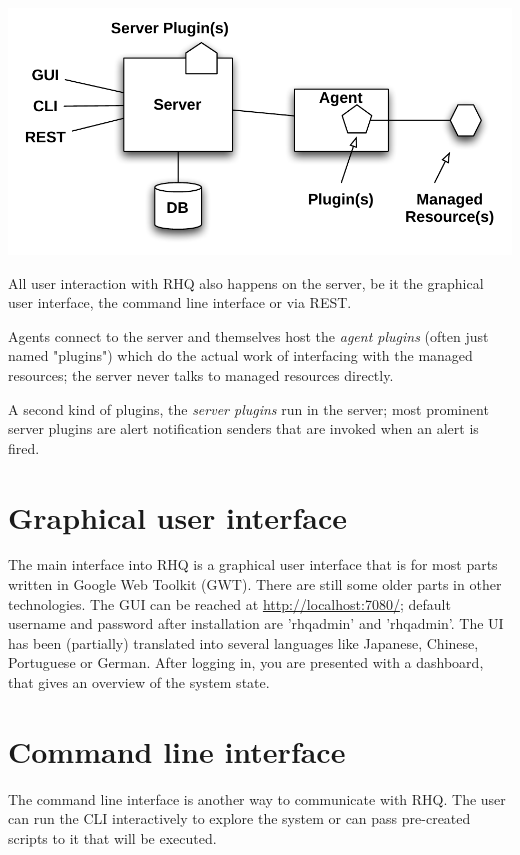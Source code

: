 \documentclass[twocolumn,10pt,a4paper]{article}
\begin{document}
\noindent\includegraphics[width=\columnwidth]{graph/arch.pdf}

All user interaction with RHQ also happens on the server, be it the graphical
user interface, the command line interface or via REST. 

Agents connect to the server and themselves host the \emph{agent plugins} (often
just named "plugins") which do the actual work of interfacing with the managed
resources; the server never talks to managed resources directly.

A second kind of plugins, the \emph{server plugins} run in the server; most
prominent server plugins are alert notification senders that are invoked when an
alert is fired.

\section{Graphical user interface}

The main interface into RHQ is a graphical user interface that is for most parts
written in Google Web Toolkit (GWT). There are still some older parts in other
technologies. The GUI can be reached at \url{http://localhost:7080/}; default
username and password after installation are 'rhqadmin' and 'rhqadmin'. The UI
has been (partially) translated into several languages like Japanese, Chinese, Portuguese or German. After logging in, you are presented with a dashboard, that gives an
overview of the system state.



\section{Command line interface}

The command line interface is another way to communicate with RHQ. The user can run the CLI interactively to explore the system or can pass pre-created scripts to it that will be executed.
\end{document}
